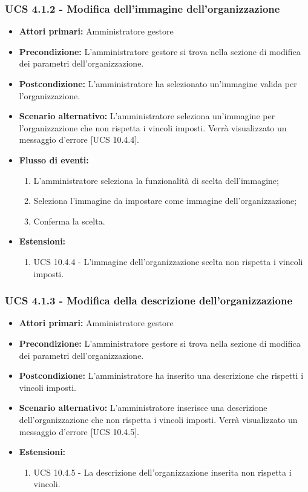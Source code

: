 \subsubsection{UCS 4.1.2 - Modifica dell'immagine dell'organizzazione}%
\begin{itemize}
\item \textbf{Attori primari:} Amministratore gestore
\item \textbf{Precondizione:} L'amministratore gestore si trova nella sezione di modifica dei parametri dell'organizzazione.
\item \textbf{Postcondizione:} L'amministratore ha selezionato un'immagine valida per l'organizzazione.
\item \textbf{Scenario alternativo:} L'amministratore seleziona un'immagine per l'organizzazione che non rispetta i vincoli imposti. Verrà visualizzato un messaggio d'errore [UCS 10.4.4].
\item \textbf{Flusso di eventi:}
\begin{enumerate}
    \item L'amministratore seleziona la funzionalità di scelta dell'immagine;
    \item Seleziona l'immagine da impostare come immagine dell'organizzazione;
    \item Conferma la scelta.
\end{enumerate}
\item \textbf{Estensioni:}
\begin{enumerate}
    \item UCS 10.4.4 - L'immagine dell'organizzazione scelta non rispetta i vincoli imposti.
\end{enumerate}
\end{itemize}

\subsubsection{UCS 4.1.3 - Modifica della descrizione dell'organizzazione}%
\begin{itemize}
\item \textbf{Attori primari:} Amministratore gestore
\item \textbf{Precondizione:} L'amministratore gestore si trova nella sezione di modifica dei parametri dell'organizzazione.
\item \textbf{Postcondizione:} L'amministratore ha inserito una descrizione che rispetti i vincoli imposti.
\item \textbf{Scenario alternativo:} L'amministratore inserisce una descrizione dell'organizzazione che non rispetta i vincoli imposti. Verrà visualizzato un messaggio d'errore [UCS 10.4.5].
\item \textbf{Estensioni:}
\begin{enumerate}
    \item UCS 10.4.5 - La descrizione dell'organizzazione inserita non rispetta i vincoli.
\end{enumerate}
\end{itemize}

